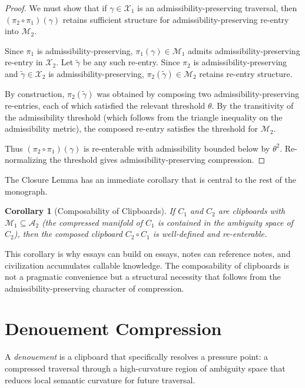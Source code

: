 \documentclass[12pt,oneside]{book}
\theoremstyle{plain}
\newtheorem{corollary}[theorem]{Corollary}
\theoremstyle{definition}
\theoremstyle{plain}
\newcommand{\cA}{\mathcal{A}}
\newcommand{\cM}{\mathcal{M}}
\newcommand{\cX}{\mathcal{X}}
\begin{document}
\begin{proof}
We must show that if $\gamma \in \cX_1$ is an admissibility-preserving traversal, then $(\pi_2 \circ \pi_1)(\gamma)$ retains sufficient structure for admissibility-preserving re-entry into $\cM_2$.

Since $\pi_1$ is admissibility-preserving, $\pi_1(\gamma) \in \cM_1$ admits admissibility-preserving re-entry in $\cX_2$. Let $\tilde\gamma$ be any such re-entry. Since $\pi_2$ is admissibility-preserving and $\tilde\gamma \in \cX_2$ is admissibility-preserving, $\pi_2(\tilde\gamma) \in \cM_2$ retains re-entry structure.

By construction, $\pi_2(\tilde\gamma)$ was obtained by composing two admissibility-preserving re-entries, each of which satisfied the relevant threshold $\theta$. By the transitivity of the admissibility threshold (which follows from the triangle inequality on the admissibility metric), the composed re-entry satisfies the threshold for $\cM_2$.

Thus $(\pi_2 \circ \pi_1)(\gamma)$ is re-enterable with admissibility bounded below by $\theta^2$. Re-normalizing the threshold gives admissibility-preserving compression.
\end{proof}

The Closure Lemma has an immediate corollary that is central to the rest of the monograph.

\begin{corollary}[Composability of Clipboards]
If $C_1$ and $C_2$ are clipboards with $\cM_1 \subseteq \cA_2$ (the compressed manifold of $C_1$ is contained in the ambiguity space of $C_2$), then the composed clipboard $C_2 \circ C_1$ is well-defined and re-enterable.
\end{corollary}

This corollary is why essays can build on essays, notes can reference notes, and civilization accumulates callable knowledge. The composability of clipboards is not a pragmatic convenience but a structural necessity that follows from the admissibility-preserving character of compression.

\section{Denouement Compression}

A \emph{denouement} is a clipboard that specifically resolves a pressure point: a compressed traversal through a high-curvature region of ambiguity space that reduces local semantic curvature for future traversal.
\end{document}
